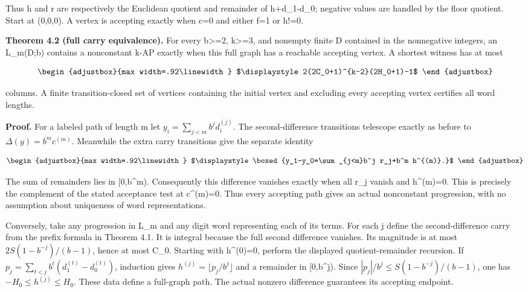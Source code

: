 Thus h\textquotesingle{} and r are respectively the Euclidean quotient and remainder of h+d\_1-d\_0; negative values are handled by the floor quotient. Start at (0,0,0). A vertex is accepting exactly when c=0 and either f=1 or h!=0.

\textbf{Theorem 4.2 (full carry equivalence).} For every b\textgreater=2, k\textgreater=3, and nonempty finite D contained in the nonnegative integers, an L\_m(D;b) contains a nonconstant k-AP exactly when this full graph has a reachable accepting vertex. A shortest witness has at most

\[
\begin{adjustbox}{max width=.92\linewidth}
$\displaystyle 2(2C_0+1)^{k-2}(2H_0+1)-1$
\end{adjustbox}
\]

columns. A finite transition-closed set of vertices containing the initial vertex and excluding every accepting vertex certifies all word lengths.

\textbf{Proof.} For a labeled path of length m let \(y_i=\sum_{j<m}b^j d_i^{(j)}\). The second-difference transitions telescope exactly as before to \(\Delta(y)=b^m c^{(m)}\). Meanwhile the extra carry transitions give the separate identity

\[
\begin{adjustbox}{max width=.92\linewidth}
$\displaystyle \boxed{y_1-y_0=\sum_{j<m}b^j r_j+b^m h^{(m)}.}$
\end{adjustbox}
\]

The sum of remainders lies in {[}0,b\^{}m). Consequently this difference vanishes exactly when all r\_j vanish and h\^{}(m)=0. This is precisely the complement of the stated acceptance test at c\^{}(m)=0. Thus every accepting path gives an actual nonconstant progression, with no assumption about uniqueness of word representations.

Conversely, take any progression in L\_m and any digit word representing each of its terms. For each j define the second-difference carry from the prefix formula in Theorem 4.1. It is integral because the full second difference vanishes. Its magnitude is at most \(2S(1-b^{-j})/(b-1)\), hence at most C\_0. Starting with h\^{}(0)=0, perform the displayed quotient-remainder recursion. If \(p_j=\sum_{t<j}b^t(d_1^{(t)}-d_0^{(t)})\), induction gives \(h^{(j)}=\lfloor p_j/b^j\rfloor\) and a remainder in {[}0,b\^{}j). Since \(|p_j|/b^j\le S(1-b^{-j})/(b-1)\), one has \(-H_0\le h^{(j)}\le H_0\). These data define a full-graph path. The actual nonzero difference guarantees its accepting endpoint.

